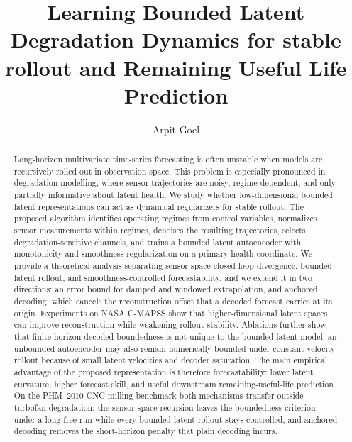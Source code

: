\documentclass[a4paper,fleqn]{cas-sc}
\begin{document}
\let\WriteBookmarks\relax
\def\floatpagepagefraction{1}
\def\textpagefraction{.001}


\title[mode=title]{Learning Bounded Latent Degradation Dynamics for stable rollout and Remaining Useful Life Prediction}

\author[1]{Arpit Goel}
\cormark[1]



\begin{abstract}
Long-horizon multivariate time-series forecasting is often unstable when models
are recursively rolled out in observation space. This problem is especially
pronounced in degradation modelling, where sensor trajectories are noisy,
regime-dependent, and only partially informative about latent health. We study
whether low-dimensional bounded latent representations can act as dynamical
regularizers for stable rollout. The proposed algorithm identifies operating
regimes from control variables, normalizes sensor measurements within regimes,
denoises the resulting trajectories, selects degradation-sensitive channels,
and trains a bounded latent autoencoder with monotonicity and smoothness
regularization on a primary health coordinate. We provide a theoretical
analysis separating sensor-space closed-loop divergence, bounded latent
rollout, and smoothness-controlled forecastability, and we extend it in two
directions: an error bound for damped and windowed extrapolation, and anchored
decoding, which cancels the reconstruction offset that a decoded forecast
carries at its origin. Experiments on NASA C-MAPSS show that
higher-dimensional latent spaces can improve reconstruction while weakening
rollout stability. Ablations further show that finite-horizon decoded
boundedness is not unique to the bounded latent model: an unbounded
autoencoder may also remain numerically bounded under constant-velocity
rollout because of small latent velocities and decoder saturation. The main
empirical advantage of the proposed representation is therefore forecastability:
lower latent curvature, higher forecast skill, and useful downstream
remaining-useful-life prediction. On the PHM~2010 CNC milling benchmark both
mechanisms transfer outside turbofan degradation: the sensor-space recursion
leaves the boundedness criterion under a long free run while every bounded
latent rollout stays controlled, and anchored decoding removes the
short-horizon penalty that plain decoding incurs.
\end{abstract}
\end{document}
